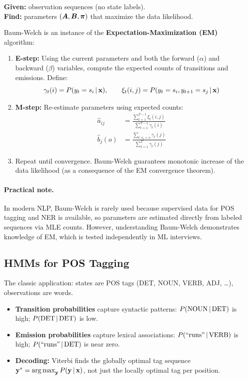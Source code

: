 \textbf{Given:} observation sequences (no state labels).\\
\textbf{Find:} parameters $(\bm{A}, \bm{B}, \bm{\pi})$ that maximize the data
likelihood.

Baum-Welch is an instance of the \textbf{Expectation-Maximization (EM)}
algorithm:
\begin{enumerate}
    \item \textbf{E-step:} Using the current parameters and both the forward
    ($\alpha$) and backward ($\beta$) variables, compute the expected counts
    of transitions and emissions.  Define:
    \[
    \gamma_t(i) = P(y_t = s_i \,|\, \mathbf{x}), \qquad
    \xi_t(i,j) = P(y_t = s_i, y_{t+1} = s_j \,|\, \mathbf{x})
    \]

    \item \textbf{M-step:} Re-estimate parameters using expected counts:
    \begin{align}
    \hat{a}_{ij} &= \frac{\sum_{t=1}^{T-1} \xi_t(i,j)}{\sum_{t=1}^{T-1} \gamma_t(i)} \label{eq:bw_transition} \\[4pt]
    \hat{b}_j(o) &= \frac{\sum_{t : x_t = o} \gamma_t(j)}{\sum_{t=1}^{T} \gamma_t(j)} \label{eq:bw_emission}
    \end{align}

    \item Repeat until convergence.  Baum-Welch guarantees monotonic increase
    of the data likelihood (as a consequence of the EM convergence theorem).
\end{enumerate}

\paragraph{Practical note.}  In modern NLP, Baum-Welch is rarely used because
supervised data for POS tagging and NER is available, so parameters are
estimated directly from labeled sequences via MLE counts.  However,
understanding Baum-Welch demonstrates knowledge of EM, which is tested
independently in ML interviews.

\subsection{HMMs for POS Tagging}

The classic application: states are POS tags (DET, NOUN, VERB, ADJ, \ldots),
observations are words.

\begin{itemize}
    \item \textbf{Transition probabilities} capture syntactic patterns:
          $P(\text{NOUN} \,|\, \text{DET})$ is high; $P(\text{DET} \,|\, \text{DET})$
          is low.
    \item \textbf{Emission probabilities} capture lexical associations:
          $P(\text{``runs''} \,|\, \text{VERB})$ is high;
          $P(\text{``runs''} \,|\, \text{DET})$ is near zero.
    \item \textbf{Decoding:} Viterbi finds the globally optimal tag sequence
          $\mathbf{y}^* = \operatorname*{arg\,max}_{\mathbf{y}} P(\mathbf{y} \,|\, \mathbf{x})$, not just the locally
          optimal tag per position.
\end{itemize}


